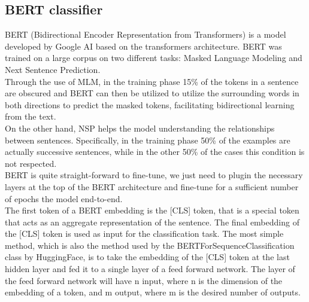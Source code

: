\subsection{BERT classifier}
BERT (Bidirectional Encoder Representation from Transformers) is a model developed by Google AI based on the transformers architecture. BERT was trained on a large corpus on two different tasks: Masked Language Modeling and Next Sentence Prediction. \\
Through the use of MLM, in the training phase 15\% of the tokens in a sentence are obscured and BERT can then be utilized to utilize the surrounding words in both directions to predict the masked tokens, facilitating bidirectional learning from the text. \\
On the other hand, NSP helps the model understanding the relationships between sentences. Specifically, in the training phase 50\% of the examples are actually successive sentences, while in the other 50\% of the cases this condition is not respected. \\
BERT is quite straight-forward to fine-tune, we just need to plugin the necessary layers at the top of the BERT architecture and fine-tune for a sufficient number of epochs the model end-to-end. \\
The first token of a BERT embedding is the [CLS] token, that is a special token that acts as an aggregate representation of the sentence. The final embedding of the [CLS] token is used as input for the classification task. The most simple method, which is also the method used by the BERTForSequenceClassification class by HuggingFace, is to take the embedding of the [CLS] token at the last hidden layer and fed it to a single layer of a feed forward network. The layer of the feed forward network will have n input, where n is the dimension of the embedding of a token, and m output, where m is the desired number of outputs. \\
 



